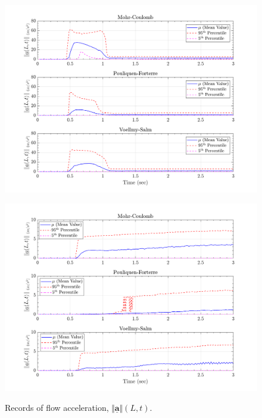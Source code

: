 \documentclass{article}
\begin{document}
\begin{figure}[H]
	\begin{minipage}[b]{0.5\linewidth}
    	\centering
    	\includegraphics[width=1\textwidth]{InclinedPlane/LocalRecords/Records/accel_L15.png}
    	\label{fig:Ramp-L3-Acc}
	\end{minipage}
	\begin{minipage}[b]{0.5\linewidth}
		\centering
		\includegraphics[width=1\textwidth]{InclinedPlane/LocalRecords/Records/accel_L17.png}
    	\label{fig:Ramp-L4-Acc}
    \end{minipage}
    \caption{Records of flow acceleration, $\Vert \underline{\mathbf{a}} \Vert(L,t)$.}
    \label{fig:Ramp-LM-Acc}    
\end{figure}
\end{document}

